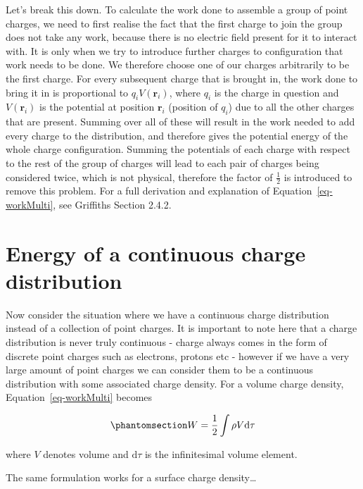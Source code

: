 \documentclass[
  letterpaper,
  DIV=11,
  numbers=noendperiod]{scrreprt}
\begin{document}
Let's break this down. To calculate the work done to assemble a group of
point charges, we need to first realise the fact that the first charge
to join the group does not take any work, because there is no electric
field present for it to interact with. It is only when we try to
introduce further charges to configuration that work needs to be done.
We therefore choose one of our charges arbitrarily to be the first
charge. For every subsequent charge that is brought in, the work done to
bring it in is proportional to \(q_i V(\mathrm{\mathbf{r}}_i)\), where
\(q_i\) is the charge in question and \(V(\mathrm{\mathbf{r}}_i)\) is
the potential at position \(\mathrm{\mathbf{r}}_i\) (position of
\(q_i\)) due to all the other charges that are present. Summing over all
of these will result in the work needed to add every charge to the
distribution, and therefore gives the potential energy of the whole
charge configuration. Summing the potentials of each charge with respect
to the rest of the group of charges will lead to each pair of charges
being considered twice, which is not physical, therefore the factor of
\(\frac{1}{2}\) is introduced to remove this problem. For a full
derivation and explanation of Equation~\ref{eq-workMulti}, see Griffiths
Section 2.4.2.

\section{Energy of a continuous charge
distribution}\label{energy-of-a-continuous-charge-distribution}

Now consider the situation where we have a continuous charge
distribution instead of a collection of point charges. It is important
to note here that a charge distribution is never truly continuous -
charge always comes in the form of discrete point charges such as
electrons, protons etc - however if we have a very large amount of point
charges we can consider them to be a continuous distribution with some
associated charge density. For a volume charge density,
Equation~\ref{eq-workMulti} becomes

\begin{equation}\phantomsection\label{eq-cont1}{ W = \frac{1}{2}\int \rho V \mathrm{d} \tau}\end{equation}

where \(V\) denotes volume and \(\mathrm{d} \tau\) is the infinitesimal
volume element.

The same formulation works for a surface charge density\ldots{}
\end{document}
